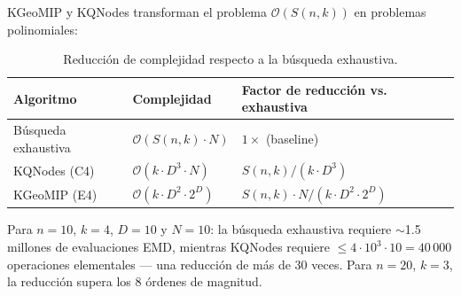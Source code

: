 KGeoMIP y KQNodes transforman el problema $\mathcal{O}(S(n,k))$ en problemas polinomiales:

\begin{table}[H]
  \centering
  \caption{Reducción de complejidad respecto a la búsqueda exhaustiva.}
  \label{tab:reduccion_complejidad}
  \begin{tabular}{lll}
    \toprule
    Algoritmo & Complejidad & Factor de reducción vs. exhaustiva \\
    \midrule
    Búsqueda exhaustiva       & $\mathcal{O}(S(n,k) \cdot N)$    & $1\times$ (baseline) \\
    KQNodes (C4)              & $\mathcal{O}(k \cdot D^3 \cdot N)$ & $S(n,k) / (k \cdot D^3)$ \\
    KGeoMIP (E4)              & $\mathcal{O}(k \cdot D^2 \cdot 2^D)$ & $S(n,k) \cdot N / (k \cdot D^2 \cdot 2^D)$ \\
    \bottomrule
  \end{tabular}
\end{table}

Para $n=10$, $k=4$, $D=10$ y $N=10$: la búsqueda exhaustiva requiere $\sim$1.5 millones de
evaluaciones EMD, mientras KQNodes requiere $\leq 4 \cdot 10^3 \cdot 10 = 40\,000$ operaciones
elementales — una reducción de más de 30 veces. Para $n=20$, $k=3$, la reducción supera los
8 órdenes de magnitud.
